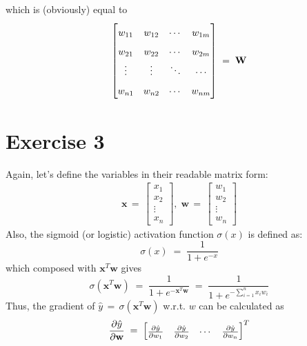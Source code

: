 \documentclass[12pt]{report}
\begin{document}
which is (obviously) equal to
\begin{align*}
    \renewcommand\arraystretch{1.65}
    \begin{bmatrix}
        w_{11} & w_{12} & \cdots & w_{1m} \\
        w_{21} & w_{22} & \cdots & w_{2m} \\
        \vdots & \vdots & \ddots & \cdots \\
        w_{n1} & w_{n2} & \cdots & w_{nm}
    \end{bmatrix}
    \;=\; \textbf{W}
\end{align*}

\clearpage

\section*{Exercise 3}
Again, let's define the variables in their readable matrix form:
\begin{align*}
    \textbf{x} \,=\,
    \begin{bmatrix}
        x_1 \\
        x_2 \\
        \vdots \\
        x_n
    \end{bmatrix}
    ,\; \textbf{w} \,=\,
    \begin{bmatrix}
        w_1 \\
        w_2 \\
        \vdots \\
        w_n
    \end{bmatrix}
\end{align*}
Also, the sigmoid (or logistic) activation function $\sigma(x)$ is defined as:
$$\sigma(x) \;=\; \frac{1}{1 + e^{-x}}$$
which composed with $\textbf{x}^T\textbf{w}$ gives
$$\sigma(\textbf{x}^T\textbf{w}) \;=\; \frac{1}{1 + e^{-\textbf{x}^T\textbf{w}}}
                                 \;=\; \frac{1}{1 + e^{-\sum\limits_{i=1}^n x_iw_i}}$$
Thus, the gradient of $\hat{y} \,=\, \sigma(\textbf{x}^T\textbf{w})$ w.r.t. $w$ can be calculated as
\begin{align*}
    \frac{\partial \hat{y}}{\partial \textbf{w}} \;=\;
    \renewcommand\arraystretch{1.5}
    \begin{bmatrix}
        \frac{\partial \hat{y}}{\partial w_1} & \frac{\partial \hat{y}}{\partial w_2} &
        \cdots & \frac{\partial \hat{y}}{\partial w_n}
    \end{bmatrix}^T
\end{align*}
\end{document}
